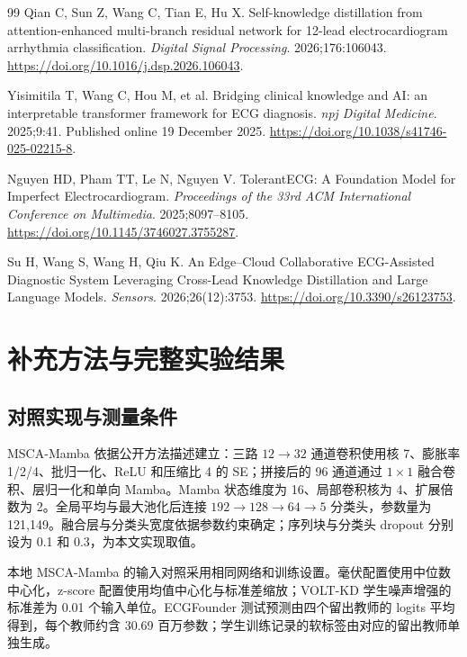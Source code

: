 \documentclass[11pt,a4paper,UTF8,fontset=windows]{ctexart}
\begin{document}
\begin{thebibliography}{99}
 Qian C, Sun Z, Wang C, Tian E, Hu X. Self-knowledge distillation from attention-enhanced multi-branch residual network for 12-lead electrocardiogram arrhythmia classification. \emph{Digital Signal Processing}. 2026;176:106043. \url{https://doi.org/10.1016/j.dsp.2026.106043}.

 Yisimitila T, Wang C, Hou M, et al. Bridging clinical knowledge and AI: an interpretable transformer framework for ECG diagnosis. \emph{npj Digital Medicine}. 2025;9:41. Published online 19 December 2025. \url{https://doi.org/10.1038/s41746-025-02215-8}.

 Nguyen HD, Pham TT, Le N, Nguyen V. TolerantECG: A Foundation Model for Imperfect Electrocardiogram. \emph{Proceedings of the 33rd ACM International Conference on Multimedia}. 2025;8097--8105. \url{https://doi.org/10.1145/3746027.3755287}.

 Su H, Wang S, Wang H, Qiu K. An Edge--Cloud Collaborative ECG-Assisted Diagnostic System Leveraging Cross-Lead Knowledge Distillation and Large Language Models. \emph{Sensors}. 2026;26(12):3753. \url{https://doi.org/10.3390/s26123753}.
\end{thebibliography}
\endgroup


\clearpage\appendix
\setcounter{table}{0}
\setcounter{figure}{0}
\section{补充方法与完整实验结果}
\subsection{对照实现与测量条件}
MSCA-Mamba 依据公开方法描述建立\cite{cetintas2026}：三路 $12\rightarrow32$ 通道卷积使用核 7、膨胀率 1/2/4、批归一化、ReLU 和压缩比 4 的 SE；拼接后的 96 通道通过 $1\times1$ 融合卷积、层归一化和单向 Mamba。Mamba 状态维度为 16、局部卷积核为 4、扩展倍数为 2。全局平均与最大池化后连接 $192\rightarrow128\rightarrow64\rightarrow5$ 分类头，参数量为 121,149。融合层与分类头宽度依据参数约束确定；序列块与分类头 dropout 分别设为 0.1 和 0.3，为本文实现取值。

本地 MSCA-Mamba 的输入对照采用相同网络和训练设置。毫伏配置使用中位数中心化，z-score 配置使用均值中心化与标准差缩放；VOLT-KD 学生噪声增强的标准差为 0.01 个输入单位。ECGFounder 测试预测由四个留出教师的 logits 平均得到，每个教师约含 30.69 百万参数；学生训练记录的软标签由对应的留出教师单独生成。
\end{document}
